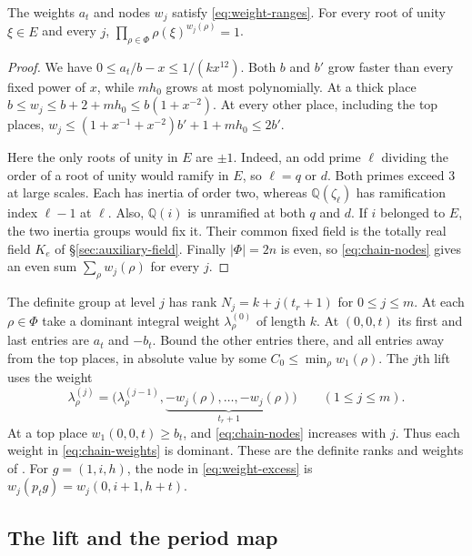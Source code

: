 \begin{lemma}\label{lem:chain-nodes}
The weights $a_t$ and nodes $w_j$ satisfy \eqref{eq:weight-ranges}.
For every root of unity $\xi\in E$ and every $j$,
$\prod_{\rho\in\Phi}\rho(\xi)^{w_j(\rho)}=1$.
\end{lemma}

\begin{proof}
We have $0\le a_t/b-x\le 1/(kx^{12})$. Both $b$ and $b'$ grow faster
than every fixed power of $x$, while $mh_0$ grows at most polynomially.
At a thick place $b\le w_j\le b+2+mh_0\le b(1+x^{-2})$. At every
other place, including the top places,
$w_j\le(1+x^{-1}+x^{-2})b'+1+mh_0\le2b'$.

Here the only roots of unity in $E$ are $\pm1$. Indeed, an odd prime
$\ell$ dividing the order of a root of unity would ramify in $E$,
so $\ell=q$ or $d$. Both primes exceed $3$ at large scales. Each has
inertia of order two, whereas $\mathbb Q(\zeta_\ell)$ has ramification
index $\ell-1$ at $\ell$. Also, $\mathbb Q(i)$ is unramified at both
$q$ and $d$. If $i$ belonged to $E$, the two inertia groups would fix
it. Their common fixed field is the totally real field $K_e$ of
\S\ref{sec:auxiliary-field}. Finally $|\Phi|=2n$ is even, so
\eqref{eq:chain-nodes} gives an even sum $\sum_\rho w_j(\rho)$ for
every $j$.
\end{proof}

The definite group at level $j$ has rank $N_j=k+j(t_r+1)$ for
$0\le j\le m$. At each $\rho\in\Phi$ take a dominant integral weight
$\lambda^{(0)}_\rho$ of length $k$. At $(0,0,t)$ its first and last
entries are $a_t$ and $-b_t$. Bound the other entries there, and all
entries away from the top places, in absolute value by some
$C_0\le\min_\rho w_1(\rho)$. The $j$th lift uses the weight
\begin{equation}\label{eq:chain-weights}
  \lambda^{(j)}_\rho=
  \bigl(\lambda^{(j-1)}_\rho,
       \underbrace{-w_j(\rho),\ldots,-w_j(\rho)}_{t_r+1}\bigr)
       \qquad(1\le j\le m).
\end{equation}
At a top place $w_1(0,0,t)\ge b_t$, and \eqref{eq:chain-nodes}
increases with $j$. Thus each weight in \eqref{eq:chain-weights} is
dominant. These are the definite ranks and weights of
\citep[\S11.1.2]{adriazola-grh}. For $g=(1,i,h)$, the node in
\eqref{eq:weight-excess} is $w_j(p_tg)=w_j(0,i+1,h+t)$.

\subsection{The lift and the period map}

